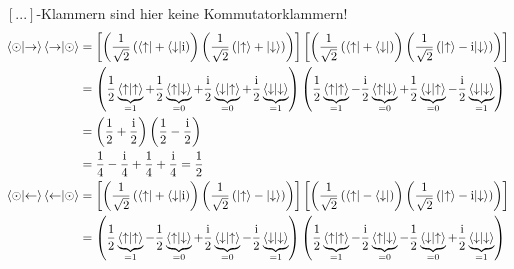     \justifying $[...]$-Klammern sind hier keine Kommutatorklammern!
    \begin{align*}
        \braket{\odot}{\to}\braket{\to}{\odot} &=
    \left[ \left( \frac{1}{\sqrt{2}}\left(\bra{\uparrow}+\bra{\downarrow}\text{i}\right) \right) 
    \left( \frac{1}{\sqrt{2}}\left(\ket{\uparrow}+\ket{\downarrow}\right) \right) \right] 
    \left[ \left( \frac{1}{\sqrt{2}}\left(\bra{\uparrow}+\bra{\downarrow}\right) \right) 
    \left( \frac{1}{\sqrt{2}}\left(\ket{\uparrow}-\text{i}\ket{\downarrow}\right) \right) \right]\\
    &= \left( \frac{1}{2} \underbrace{\braket{\uparrow}{\uparrow}}_{=1} 
    + \frac{1}{2} \underbrace{\braket{\uparrow}{\downarrow}}_{=0}
    + \frac{\text{i}}{2} \underbrace{\braket{\downarrow}{\uparrow}}_{=0} 
    + \frac{\text{i}}{2} \underbrace{\braket{\downarrow}{\downarrow}}_{=1} \right)
    \left( \frac{1}{2} \underbrace{\braket{\uparrow}{\uparrow}}_{=1} 
    - \frac{\text{i}}{2} \underbrace{\braket{\uparrow}{\downarrow}}_{=0}
    + \frac{1}{2} \underbrace{\braket{\downarrow}{\uparrow}}_{=0} 
    - \frac{\text{i}}{2} \underbrace{\braket{\downarrow}{\downarrow}}_{=1} \right)\\
    &= \left( \frac{1}{2} + \frac{\text{i}}{2} \right) \left( \frac{1}{2} - \frac{\text{i}}{2} \right)\\
    &= \frac{1}{4} - \frac{\text{i}}{4} + \frac{1}{4} + \frac{\text{i}}{4} = \frac{1}{2}\\
        \braket{\odot}{\leftarrow}\braket{\leftarrow}{\odot} &=
    \left[ \left( \frac{1}{\sqrt{2}}\left(\bra{\uparrow}+\bra{\downarrow}\text{i}\right) \right) 
    \left( \frac{1}{\sqrt{2}}\left(\ket{\uparrow}-\ket{\downarrow}\right) \right) \right] 
    \left[ \left( \frac{1}{\sqrt{2}}\left(\bra{\uparrow}-\bra{\downarrow}\right) \right) 
    \left( \frac{1}{\sqrt{2}}\left(\ket{\uparrow}-\text{i}\ket{\downarrow}\right) \right) \right]\\
    &= \left( \frac{1}{2} \underbrace{\braket{\uparrow}{\uparrow}}_{=1} 
    - \frac{1}{2} \underbrace{\braket{\uparrow}{\downarrow}}_{=0}
    + \frac{\text{i}}{2} \underbrace{\braket{\downarrow}{\uparrow}}_{=0} 
    - \frac{\text{i}}{2} \underbrace{\braket{\downarrow}{\downarrow}}_{=1} \right)
    \left( \frac{1}{2} \underbrace{\braket{\uparrow}{\uparrow}}_{=1} 
    - \frac{\text{i}}{2} \underbrace{\braket{\uparrow}{\downarrow}}_{=0}
    - \frac{1}{2} \underbrace{\braket{\downarrow}{\uparrow}}_{=0} 
    + \frac{\text{i}}{2} \underbrace{\braket{\downarrow}{\downarrow}}_{=1} \right)\\

\end{align*}
